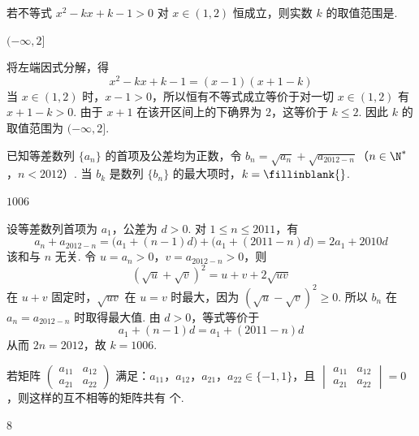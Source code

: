 \begin{problem}
若不等式 \(x^2-kx+k-1>0\) 对 \(x\in(1,2)\) 恒成立，则实数 \(k\) 的取值范围是\fillinblank{}.
\end{problem}

\begin{answer}
\((-\infty,2]\)
\end{answer}

\begin{solution}
将左端因式分解，得
\[
x^2-kx+k-1=(x-1)(x+1-k)
\]
当 \(x\in(1,2)\) 时，\(x-1>0\)，所以恒有不等式成立等价于对一切 \(x\in(1,2)\) 有 \(x+1-k>0\). 由于 \(x+1\) 在该开区间上的下确界为 \(2\)，这等价于 \(k\le2\). 因此 \(k\) 的取值范围为 \((-\infty,2]\).
\end{solution}

\begin{problem}
已知等差数列 \(\{a_n\}\) 的首项及公差均为正数，令 \(b_n=\sqrt{a_n}+\sqrt{a_{2012-n}}\)（\(n\in\N^*\)，\(n<2012\)）. 当 \(b_k\) 是数列 \(\{b_n\}\) 的最大项时，\(k=\fillinblank{}\).
\end{problem}

\begin{answer}
\(1006\)
\end{answer}

\begin{solution}
设等差数列首项为 \(a_1\)，公差为 \(d>0\). 对 \(1\le n\le2011\)，有
\[
a_n+a_{2012-n}=\bigl(a_1+(n-1)d\bigr)+\bigl(a_1+(2011-n)d\bigr)=2a_1+2010d
\]
该和与 \(n\) 无关. 令 \(u=a_n>0\)，\(v=a_{2012-n}>0\)，则
\[
(\sqrt u+\sqrt v)^2=u+v+2\sqrt{uv}
\]
在 \(u+v\) 固定时，\(\sqrt{uv}\) 在 \(u=v\) 时最大，因为 \((\sqrt u-\sqrt v)^2\ge0\). 所以 \(b_n\) 在 \(a_n=a_{2012-n}\) 时取得最大值. 由 \(d>0\)，等式等价于
\[
a_1+(n-1)d=a_1+(2011-n)d
\]
从而 \(2n=2012\)，故 \(k=1006\).
\end{solution}

\begin{problem}
若矩阵 \(\begin{pmatrix}a_{11}&a_{12}\\a_{21}&a_{22}\end{pmatrix}\) 满足：\(a_{11}\)，\(a_{12}\)，\(a_{21}\)，\(a_{22}\in\{-1,1\}\)，且 \(\begin{vmatrix}a_{11}&a_{12}\\a_{21}&a_{22}\end{vmatrix}=0\)，则这样的互不相等的矩阵共有\fillinblank{} 个.
\end{problem}

\begin{answer}
\(8\)
\end{answer}

